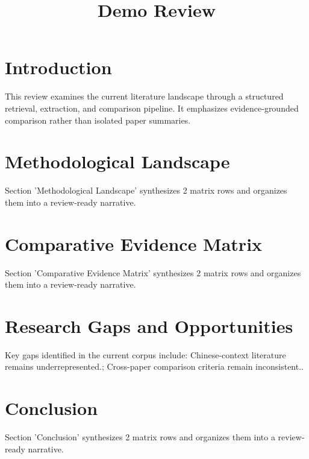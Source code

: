 \documentclass{article}
\title{Demo Review}
\begin{document}
\maketitle
\section{Introduction}
This review examines the current literature landscape through a structured retrieval, extraction, and comparison pipeline. It emphasizes evidence-grounded comparison rather than isolated paper summaries.

\section{Methodological Landscape}
Section 'Methodological Landscape' synthesizes 2 matrix rows and organizes them into a review-ready narrative.

\section{Comparative Evidence Matrix}
Section 'Comparative Evidence Matrix' synthesizes 2 matrix rows and organizes them into a review-ready narrative.

\section{Research Gaps and Opportunities}
Key gaps identified in the current corpus include: Chinese-context literature remains underrepresented.; Cross-paper comparison criteria remain inconsistent..

\section{Conclusion}
Section 'Conclusion' synthesizes 2 matrix rows and organizes them into a review-ready narrative.
\end{document}
